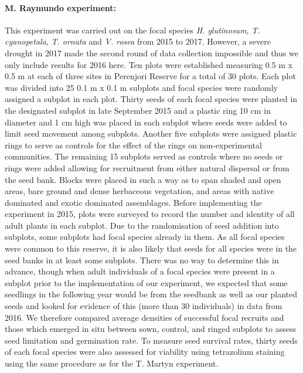 \begin{refsection}
        \paragraph{M. Raymundo experiment:}
        This experiment was carried out on the focal species \textit{H. glutinosum}, \textit{T. cyanopetala}, \textit{T. ornata} and \textit{V. rosea} from 2015 to 2017. However, a severe drought in 2017 made the second round of data collection impossible and thus we only include results for 2016 here. Ten plots were established measuring 0.5 m x 0.5 m at each of three sites in Perenjori Reserve for a total of 30 plots. Each plot was divided into 25 0.1 m x 0.1 m subplots and focal species were randomly assigned a subplot in each plot. Thirty seeds of each focal species were planted in the designated subplot in late September 2015 and a plastic ring 10 cm in diameter and 1 cm high was placed in each subplot where seeds were added to limit seed movement among subplots. Another five subplots were assigned plastic rings to serve as controls for the effect of the rings on non-experimental communities. The remaining 15 subplots served as controls where no seeds or rings were added allowing for recruitment from either natural dispersal or from the seed bank. Blocks were placed in such a way as to span shaded and open areas, bare ground and dense herbaceous vegetation, and areas with native dominated and exotic dominated assemblages. Before implementing the experiment in 2015, plots were surveyed to record the number and identity of all adult plants in each subplot. Due to the randomisation of seed addition into subplots, some subplots had focal species already in them. As all focal species were common to this reserve, it is also likely that seeds for all species were in the seed banks in at least some subplots. There was no way to determine this in advance, though when adult individuals of a focal species were present in a subplot prior to the implementation of our experiment, we expected that some seedlings in the following year would be from the seedbank as well as our planted seeds and looked for evidence of this (more than 30 individuals) in data from 2016. We therefore compared average densities of successful focal recruits and those which emerged in situ between sown, control, and ringed subplots to assess seed limitation and germination rate. To measure seed survival rates, thirty seeds of each focal species were also assessed for viability using tetrazolium staining using the same procedure as for the T. Martyn experiment. 


\end{refsection}
